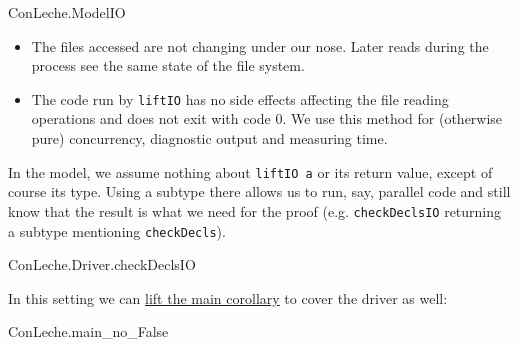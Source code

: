 \documentclass{article}
\newcommand\code[1]{\texttt{#1}}
\begin{document}
\begin{leanblock}[view=lean, sum=0LPg9llNwT]{ConLeche.ModelIO}{}
\end{leanblock}

\begin{itemize}
\item The files accessed are not changing under our nose. Later reads during the process see the same state of the file system.
\item The code run by \code{liftIO} has no side effects affecting the file reading operations and does not exit with code 0. We use this method for (otherwise pure) concurrency, diagnostic output and measuring time.
\end{itemize}

In the model, we assume nothing about \code{liftIO a} or its return value, except of course its type. Using a subtype there allows us to run, say, parallel code and still know that the result is what we need for the proof (e.g. \code{checkDeclsIO} returning a subtype mentioning \code{checkDecls}).

\begin{leanblock}[view=lean, sum=MOXlOOgsz_]{ConLeche.Driver.checkDeclsIO}{}
\end{leanblock}

In this setting we can \href{https://github.com/leanprover/con-leche/blob/master/ConLeche/MainTheorem.lean#L149-L151}{lift the main corollary} to cover the driver as well:

\begin{leanblock}[view=lean, sum=WmZxtFae_4]{ConLeche.main_no_False}{}
\end{leanblock}
\end{document}
